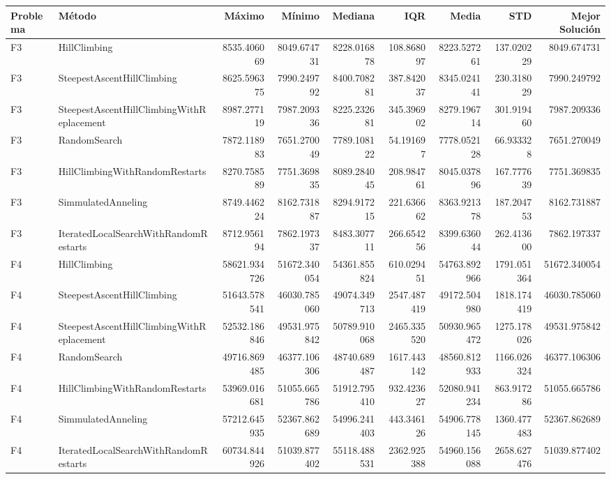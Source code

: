 \begin{tabular}{llrrrrrrr}
\toprule
Problema & Método & Máximo & Mínimo & Mediana & IQR & Media & STD & Mejor Solución \\
\midrule
F3 & HillClimbing & 8535.406069 & 8049.674731 & 8228.016878 & 108.868097 & 8223.527261 & 137.020229 & 8049.674731 \\
F3 & SteepestAscentHillClimbing & 8625.596375 & 7990.249792 & 8400.708281 & 387.842037 & 8345.024141 & 230.318029 & 7990.249792 \\
F3 & SteepestAscentHillClimbingWithReplacement & 8987.277119 & 7987.209336 & 8225.232681 & 345.396902 & 8279.196714 & 301.919460 & 7987.209336 \\
F3 & RandomSearch & 7872.118983 & 7651.270049 & 7789.108122 & 54.191697 & 7778.052128 & 66.933328 & 7651.270049 \\
F3 & HillClimbingWithRandomRestarts & 8270.758589 & 7751.369835 & 8089.284045 & 208.984761 & 8045.037896 & 167.777639 & 7751.369835 \\
F3 & SimmulatedAnneling & 8749.446224 & 8162.731887 & 8294.917215 & 221.636662 & 8363.921378 & 187.204753 & 8162.731887 \\
F3 & IteratedLocalSearchWithRandomRestarts & 8712.956194 & 7862.197337 & 8483.307711 & 266.654256 & 8399.636044 & 262.413600 & 7862.197337 \\
F4 & HillClimbing & 58621.934726 & 51672.340054 & 54361.855824 & 610.029451 & 54763.892966 & 1791.051364 & 51672.340054 \\
F4 & SteepestAscentHillClimbing & 51643.578541 & 46030.785060 & 49074.349713 & 2547.487419 & 49172.504980 & 1818.174419 & 46030.785060 \\
F4 & SteepestAscentHillClimbingWithReplacement & 52532.186846 & 49531.975842 & 50789.910068 & 2465.335520 & 50930.965472 & 1275.178026 & 49531.975842 \\
F4 & RandomSearch & 49716.869485 & 46377.106306 & 48740.689487 & 1617.443142 & 48560.812933 & 1166.026324 & 46377.106306 \\
F4 & HillClimbingWithRandomRestarts & 53969.016681 & 51055.665786 & 51912.795410 & 932.423627 & 52080.941234 & 863.917286 & 51055.665786 \\
F4 & SimmulatedAnneling & 57212.645935 & 52367.862689 & 54996.241403 & 443.346126 & 54906.778145 & 1360.477483 & 52367.862689 \\
F4 & IteratedLocalSearchWithRandomRestarts & 60734.844926 & 51039.877402 & 55118.488531 & 2362.925388 & 54960.156088 & 2658.627476 & 51039.877402 \\

\end{tabular}
